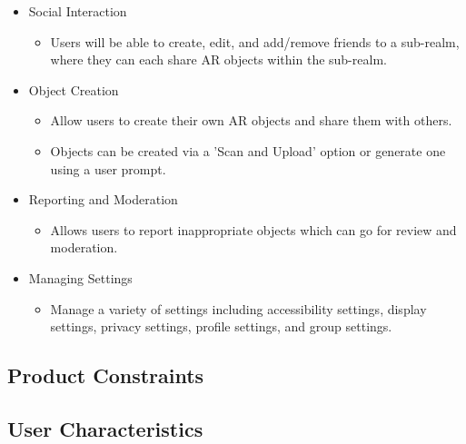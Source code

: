 \documentclass{article}
\begin{document}
\begin{itemize}
    \item Social Interaction
    \begin{itemize}
        \item Users will be able to create, edit, and add/remove friends to a sub-realm, where they can each share AR objects within the sub-realm.
    \end{itemize}

    \item Object Creation
    \begin{itemize}
        \item Allow users to create their own AR objects and share them with others.
        \item Objects can be created via a 'Scan and Upload' option or generate one using a user prompt.
    \end{itemize}

    \item Reporting and Moderation
    \begin{itemize}
        \item Allows users to report inappropriate objects which can go for review and moderation.
    \end{itemize}

    \item Managing Settings
    \begin{itemize}
        \item Manage a variety of settings including accessibility settings, display settings, privacy settings, profile settings, and group settings.
    \end{itemize}
\end{itemize}
\subsection{Product Constraints}
\subsection{User Characteristics}
\end{document}
